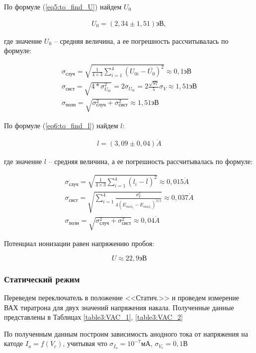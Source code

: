 \documentclass[a4paper,12pt]{article}
\begin{document}
По формуле (\ref{eq5:to_find_U}) найдем $U_0$

\begin{align*}
	U_0 = (2,34 \pm 1,51) эВ,
\end{align*}

где значение $U_0$ -- средняя величина, а ее погрешность рассчитывалась по формуле:

\begin{align*}
	\sigma_{случ} = \sqrt{ \frac{1}{4 \times 3} \sum \limits_{i=1}^{4} (U_{0i} - \overline{U_0})^2 } \approx 0,1 эВ \\
	\sigma_{сист} = \sqrt{4 * \sigma^2_{U_{0i}}} = 2 \sigma_{U_{0i}} = 2 \frac{\sqrt{97}}{5} \sigma_{V} \approx 1,51 эВ \\
	\sigma_{полн} = \sqrt{\sigma^2_{случ} + \sigma^2_{сист}} \approx 1,51 эВ
\end{align*}

По формуле (\ref{eq6:to_find_l}) найдем $l$:

\begin{align*}
	l = (3,09 \pm 0,04) \mathring{A}
\end{align*}

где значение $l$ -- средняя величина, а ее погрешность рассчитывалась по формуле:

\begin{align*}
	\sigma_{случ} = \sqrt{ \frac{1}{4 \times 3} \sum \limits_{i=1}^{4} (l_{i} - \overline{l})^2 } \approx 0,015 \mathring{A} \\
	\sigma_{сист} = \sqrt{\sum \limits_{i=1}^{4} \frac{\sigma^2_V}{4 (E_{min_i} - E_{max_i})^{3/2}}} \approx 0,037 \mathring{A}\\
	\sigma_{полн} = \sqrt{\sigma^2_{случ} + \sigma^2_{сист}} \approx 0,04 \mathring{A} 
\end{align*}

Потенциал ионизации равен напряжению пробоя:

$$
	U \approx 22,9 эВ
$$

\newpage

\subsubsection*{Статический режим}

Переведем переключатель в положение <<Статич.>> и проведем измерение ВАХ тиратрона для двух значений напряжения накала. Полученные данные представлены в Таблицах \ref{table3:VAC_1}, \ref{table3:VAC_2}

По полученным данным построим зависимость анодного тока от напряжения на катоде $I_a = f(V_c)$, учитывая что $\sigma_{I_a} = 10^{-7} мА$, $\sigma_{V_c} = 0,1 В$
\end{document}
